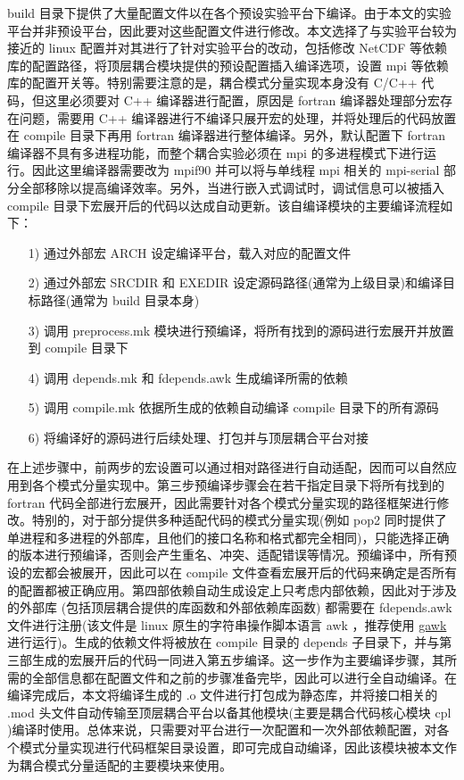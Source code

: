 build 目录下提供了大量配置文件以在各个预设实验平台下编译。由于本文的实验平台并非预设平台，因此要对这些配置文件进行修改。本文选择了与实验平台较为接近的 linux 配置并对其进行了针对实验平台的改动，包括修改 NetCDF 等依赖库的配置路径，将顶层耦合模块提供的预设配置插入编译选项，设置 mpi 等依赖库的配置开关等。特别需要注意的是，耦合模式分量实现本身没有 C/C++ 代码，但这里必须要对 C++ 编译器进行配置，原因是 fortran 编译器处理部分宏存在问题，需要用 C++ 编译器进行不编译只展开宏的处理，并将处理后的代码放置在 compile 目录下再用 fortran 编译器进行整体编译。另外，默认配置下 fortran 编译器不具有多进程功能，而整个耦合实验必须在 mpi 的多进程模式下进行运行。因此这里编译器需要改为 mpif90 并可以将与单线程 mpi 相关的 mpi-serial 部分全部移除以提高编译效率。另外，当进行嵌入式调试时，调试信息可以被插入 compile 目录下宏展开后的代码以达成自动更新。该自编译模块的主要编译流程如下：

\begin{itemize}
  \item [1)] 
通过外部宏 ARCH 设定编译平台，载入对应的配置文件
  \item [2)]
通过外部宏 SRCDIR 和 EXEDIR 设定源码路径(通常为上级目录)和编译目标路径(通常为 build 目录本身)
  \item [3)]
调用 preprocess.mk 模块进行预编译，将所有找到的源码进行宏展开并放置到 compile 目录下
  \item [4)]
调用 depends.mk 和 fdepends.awk 生成编译所需的依赖
  \item [5)]
调用 compile.mk 依据所生成的依赖自动编译 compile 目录下的所有源码
  \item [6)]
将编译好的源码进行后续处理、打包并与顶层耦合平台对接
\end{itemize}

在上述步骤中，前两步的宏设置可以通过相对路径进行自动适配，因而可以自然应用到各个模式分量实现中。第三步预编译步骤会在若干指定目录下将所有找到的 fortran 代码全部进行宏展开，因此需要针对各个模式分量实现的路径框架进行修改。特别的，对于部分提供多种适配代码的模式分量实现(例如 pop2 同时提供了单进程和多进程的外部库，且他们的接口名称和格式都完全相同)，只能选择正确的版本进行预编译，否则会产生重名、冲突、适配错误等情况。预编译中，所有预设的宏都会被展开，因此可以在 compile 文件查看宏展开后的代码来确定是否所有的配置都被正确应用。第四部依赖自动生成设定上只考虑内部依赖，因此对于涉及的外部库 (包括顶层耦合提供的库函数和外部依赖库函数) 都需要在 fdepends.awk 文件进行注册(该文件是 linux 原生的字符串操作脚本语言 awk ，推荐使用 \href{https://www.gnu.org/software/gawk/manual/gawk.html#Getting-Started}{gawk} 进行运行)。生成的依赖文件将被放在 compile 目录的 depends 子目录下，并与第三部生成的宏展开后的代码一同进入第五步编译。这一步作为主要编译步骤，其所需的全部信息都在配置文件和之前的步骤准备完毕，因此可以进行全自动编译。在编译完成后，本文将编译生成的 .o 文件进行打包成为静态库，并将接口相关的 .mod 头文件自动传输至顶层耦合平台以备其他模块(主要是耦合代码核心模块 cpl )编译时使用。总体来说，只需要对平台进行一次配置和一次外部依赖配置，对各个模式分量实现进行代码框架目录设置，即可完成自动编译，因此该模块被本文作为耦合模式分量适配的主要模块来使用。

